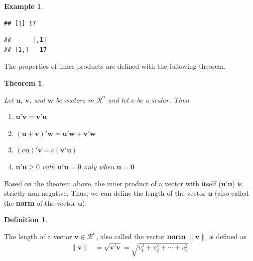 \documentclass[
]{book}
\newenvironment{Shaded}{\begin{snugshade}}{\end{snugshade}}
\newcommand{\KeywordTok}[1]{\textcolor[rgb]{0.13,0.29,0.53}{\textbf{#1}}}
\newcommand{\NormalTok}[1]{#1}
\newcommand{\OperatorTok}[1]{\textcolor[rgb]{0.81,0.36,0.00}{\textbf{#1}}}
\newcommand{\StringTok}[1]{\textcolor[rgb]{0.31,0.60,0.02}{#1}}
\newtheorem{theorem}{Theorem}[chapter]
\theoremstyle{definition}
\newtheorem{definition}{Definition}[chapter]
\theoremstyle{definition}
\newtheorem{example}{Example}[chapter]
\theoremstyle{definition}
\theoremstyle{remark}
\begin{document}
\begin{example}
\begin{verbatim}
## [1] 17
\end{verbatim}

\begin{Shaded}
\end{Shaded}

\begin{verbatim}
##      [,1]
## [1,]   17
\end{verbatim}

\end{example}

The properties of inner products are defined with the following theorem.

\begin{theorem}
\protect\hypertarget{thm:unlabeled-div-186}{}\label{thm:unlabeled-div-186}

Let \(\mathbf{u}\), \(\mathbf{v}\), and \(\mathbf{w}\) be vectors in \(\mathcal{R}^n\) and let \(c\) be a scalar. Then

\begin{enumerate}
\def\labelenumi{\alph{enumi})}
\item
  \(\mathbf{u}'\mathbf{v} = \mathbf{v}'\mathbf{u}\)
\item
  \((\mathbf{u} + \mathbf{v})' \mathbf{w} = \mathbf{u}' \mathbf{w} + \mathbf{v}' \mathbf{w}\)
\item
  \(( c \mathbf{u} )' \mathbf{v} = c ( \mathbf{v}'\mathbf{u} )\)
\item
  \(\mathbf{u}'\mathbf{u} \geq 0\) with \(\mathbf{u}'\mathbf{u} = 0\) only when \(\mathbf{u} = \mathbf{0}\)
\end{enumerate}

\end{theorem}

Based on the theorem above, the inner product of a vector with itself (\(\mathbf{u}'\mathbf{u}\)) is strictly non-negative. Thus, we can define the length of the vector \(\mathbf{u}\) (also called the \textbf{norm} of the vector \(\mathbf{u}\)).

\begin{definition}
\protect\hypertarget{def:unlabeled-div-187}{}\label{def:unlabeled-div-187}

The length of a vector \(\mathbf{v} \in \mathcal{R}^n\), also called the vector \textbf{norm} \(\| \mathbf{v} \|\) is defined as
\[
\begin{aligned}
\| \mathbf{v} \| & = \sqrt{\mathbf{v}'\mathbf{v}} = \sqrt{v_1^2 + v_2^2 + \cdots + v_n^2}
\end{aligned}
\]

\end{definition}
\end{document}
